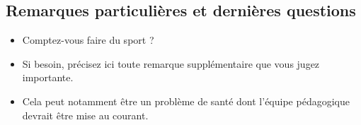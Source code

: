 \hr{}
\subsection*{Remarques particulières et dernières questions}
\begin{itemize}
    \item Comptez-vous faire du sport ?
    \item Si besoin, précisez ici toute remarque supplémentaire que vous jugez importante.
    \item Cela peut notamment être un problème de santé dont l'équipe pédagogique devrait être mise au courant.
\end{itemize}




